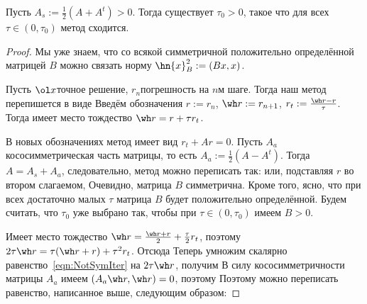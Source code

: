 \documentclass[a4paper]{article}
\begin{document}
\begin{theorem}
Пусть  $A_s := \frac12(A + A^t) > 0$. Тогда существует $\tau_0 > 0$, такое что для всех $\tau \in (0,\tau_0)$
метод
сходится.
\end{theorem}
\begin{proof}
Мы уже знаем, что со всякой симметричной положительно определённой матрицей $B$
можно связать норму $\hn{x}^2_B := (Bx,x)$.

Пусть $\ol x$\т точное решение, $r_n$\т погрешность на $n$\д м шаге. Тогда наш метод
перепишется в виде
Введём обозначения $r := r_n$, $\wh r := r_{n+1}$, $r_t := \frac{\wh r - r}{\tau}$. Тогда имеет место тождество
$\wh r = r + \tau r_t$.

В новых обозначениях метод имеет вид $r_t + Ar = 0$. Пусть $A_a$\т кососимметрическая часть
матрицы, то есть $A_a := \frac12(A - A^t)$. Тогда $A = A_s + A_a$, следовательно,
метод можно переписать так:
или, подставляя $r$ во втором слагаемом,
Очевидно, матрица $B$ симметрична. Кроме того, ясно, что при всех достаточно малых $\tau$ матрица $B$ будет положительно определённой.
Будем считать, что $\tau_0$ уже выбрано так, чтобы при $\tau \in (0,\tau_0)$ имеем $B > 0$.

Имеет место тождество $\wh r = \frac{\wh r + r}{2} + \frac{\tau}{2} r_t$,
поэтому $2\tau \wh r = \tau (\wh r + r) + \tau^2 r_t$.
Отсюда
Теперь умножим скалярно равенство~\eqref{eqn:NotSymIter} на $2\tau \wh r$,
получим
В силу кососимметричности матрицы $A_a$ имеем $(A_a \wh r, \wh r) = 0$, поэтому
Поэтому можно переписать равенство, написанное выше, следующим образом:


\end{proof}
\end{document}
